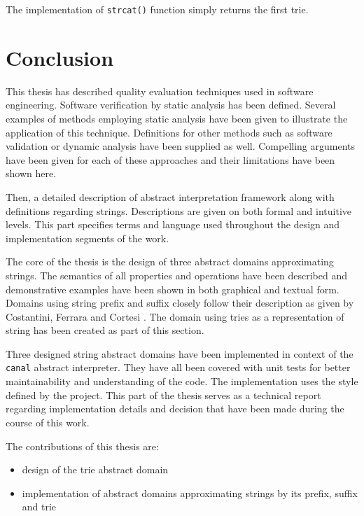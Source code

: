 \documentclass[12pt,final,oneside]{fithesis2}
\theoremstyle{definition}
\begin{document}
The implementation of \texttt{strcat()} function simply returns the first trie.


\chapter{Conclusion}
\label{chap:conclusion}

This thesis has described quality evaluation techniques used in software
engineering. Software verification by static analysis has been defined.
Several examples of methods employing static analysis have been given to
illustrate the application of this technique. Definitions for other methods
such as software validation or dynamic analysis have been supplied as well.
Compelling arguments have been given for each of these approaches and their
limitations have been shown here.

Then, a detailed description of abstract interpretation framework
along with definitions regarding strings. Descriptions are given on both
formal and intuitive levels. This part specifies terms and language used
throughout the design and implementation segments of the work.

The core of the thesis is the design of three abstract domains
approximating strings. The semantics of all properties and operations
have been described and demonstrative examples have been shown in both
graphical and textual form. Domains using string prefix and suffix
closely follow their description as given by Costantini, Ferrara and
Cortesi \cite{Constantini11-1}. The domain using tries as a representation
of string has been created as part of this section.

Three designed string abstract domains have been implemented in context of
the \texttt{canal} abstract interpreter. They have all been covered with
unit tests for better maintainability and understanding of the code.
The implementation uses the style defined by the project. This
part of the thesis serves as a technical report regarding implementation
details and decision that have been made during the course of this work.

The contributions of this thesis are:

\begin{itemize}

\item design of the trie abstract domain

\item implementation of abstract domains approximating strings by its
prefix, suffix and trie

\end{itemize}
\end{document}
